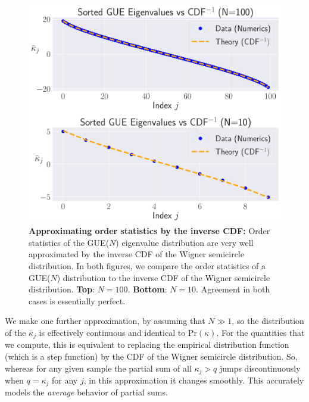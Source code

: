 \documentclass[aps,pra, twocolumn]{revtex4-1}
\begin{document}
\begin{figure}[t]
\includegraphics[width=\columnwidth]{Images/Figure_8.pdf}
\caption{\textbf{Approximating order statistics by the inverse CDF:} Order statistics of the GUE($N$) eigenvalue distribution are very well approximated by the inverse CDF of the Wigner semicircle distribution.  In both figures, we compare the order statistics of a GUE($N$) distribution to the inverse CDF of the Wigner semicircle distribution. \textbf{Top}:  $N=100$.  \textbf{Bottom}:  $N=10$.
Agreement in both cases is essentially perfect.}
\label{fig:orderstatistics2}
\end{figure}

We make one further approximation, by assuming that $N\gg1$, so the distribution of the $\overline{\kappa}_j$ is effectively continuous and identical to $\mathrm{Pr}(\kappa)$. For the quantities that we compute, this is equivalent to replacing the empirical distribution function (which is a step function) by the CDF of the Wigner semicircle distribution.  So, whereas for any given sample the partial sum of all $\kappa_j > q$ jumps discontinuously when $q=\kappa_j$ for any $j$, in this approximation it changes smoothly.  This accurately models the \emph{average} behavior of partial sums.
\end{document}
